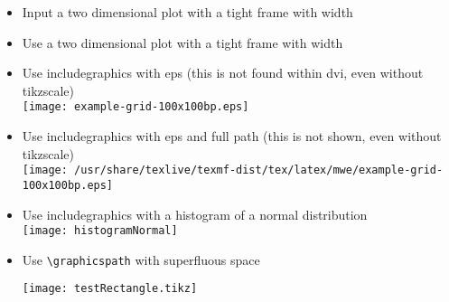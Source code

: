 \documentclass[twocolumn]{article}
\begin{document}
\begin{itemize}
			\item Input a two dimensional plot with a tight frame with width \newlength{\mylen}\settowidth{\mylen}{\frame{}}\the\mylen\\%
				\frame{}
			\item Use a two dimensional plot with a tight frame with width \the\mylen\\%
		\else
			\item Use includegraphics with eps (this is not found within dvi, even without tikzscale)\\%
				\texttt{[image: example-grid-100x100bp.eps]}%
			\item Use includegraphics with eps and full path (this is not shown, even without tikzscale)\\%
				\texttt{[image: /usr/share/texlive/texmf-dist/tex/latex/mwe/example-grid-100x100bp.eps]}%
		\fi
		\item Use includegraphics with a histogram of a normal distribution\\%
			\texttt{[image: histogramNormal]}%
		\item {Use \texttt{\textbackslash graphicspath} with superfluous space\graphicspath{{somefolder} }
			\texttt{[image: testRectangle.tikz]}}%
	\end{itemize}
\end{document}
